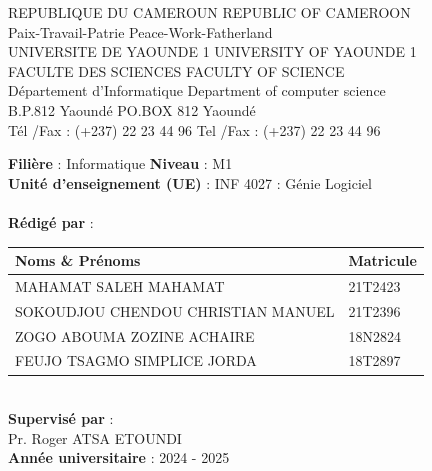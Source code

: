 \documentclass[14pt,a4paper]{report}
\begin{document}
\begin{titlepage}
    \begin{center}
        {\large REPUBLIQUE DU CAMEROUN \hfill REPUBLIC OF CAMEROON}\\
        {\small Paix-Travail-Patrie \hfill Peace-Work-Fatherland}\\[0.5cm]
        {\large UNIVERSITE DE YAOUNDE 1 \hfill UNIVERSITY OF YAOUNDE 1}\\
        {\large FACULTE DES SCIENCES \hfill FACULTY OF SCIENCE}\\
        {\large Département d'Informatique \hfill Department of computer science}\\
        {\small B.P.812 Yaoundé \hfill PO.BOX 812 Yaoundé}\\
        {\small Tél /Fax : (+237) 22 23 44 96 \hfill Tel /Fax : (+237) 22 23 44 96}\\[2cm]

        \begin{center}
            {\large \textbf{Filière} : Informatique \hspace{2cm} \textbf{Niveau} : M1}\\
            {\large \textbf{Unité d'enseignement (UE)} : INF 4027 : Génie Logiciel}\\[2cm]

            \\[2cm]

            \textbf{Rédigé par} :\\[0.5cm]
            \begin{tabular}{|l|l|}
                \hline
                \textbf{Noms \& Prénoms} & \textbf{Matricule} \\
                \hline
                MAHAMAT SALEH MAHAMAT & 21T2423 \\
                \hline
                SOKOUDJOU CHENDOU CHRISTIAN MANUEL & 21T2396 \\
                \hline
                ZOGO ABOUMA ZOZINE ACHAIRE & 18N2824 \\
                \hline
                FEUJO TSAGMO SIMPLICE JORDA & 18T2897 \\
                \hline
            \end{tabular}\\[2cm]

            \textbf{Supervisé par} :\\
            Pr. Roger ATSA ETOUNDI\\[1cm]

            \textbf{Année universitaire} : 2024 - 2025
        \end{center}
    \end{center}
\end{titlepage}
\end{document}
